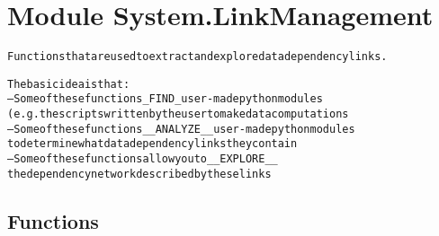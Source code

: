 %
%
%


\section{Module System.LinkManagement}

    \label{System:LinkManagement}
\begin{alltt}

Functions that are used to extract and explore data dependency links.

The basic idea is that:   
-- Some of these functions \_FIND\_ user-made python modules 
(e.g. the scripts written by the user to make data computations
-- Some of these functions \_\_ANALYZE\_\_ user-made python modules 
        to determine what data dependency links they contain
-- Some of these functions allow you to \_\_EXPLORE\_\_ 
        the dependency network described by these links 
\end{alltt}



  \subsection{Functions}

    \label{System:LinkManagement:LinksFromOperations}

    \vspace{0.5ex}

